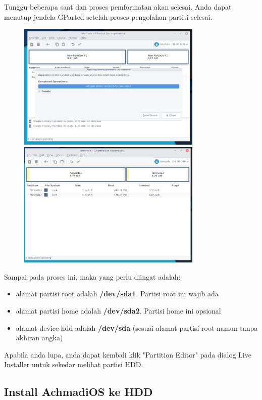 \documentclass[12pt,]{article}
\begin{document}
	Tunggu beberapa saat dan proses pemformatan akan selesai.
	Anda dapat menutup jendela GParted setelah proses pengolahan partisi selesai.
	
	\begin{figure}[h]
		\centering
		\includegraphics[width=250pt]{installhdd/step_14}
		\includegraphics[width=250pt]{installhdd/step_15}
	\end{figure}
	
	Sampai pada proses ini, maka yang perlu diingat adalah:
	\begin{itemize}
		\item alamat partisi root adalah \textbf{/dev/sda1}. Partisi root ini wajib ada
		\item alamat partisi home adalah \textbf{/dev/sda2}. Partisi home ini opsional
		\item alamat device hdd adalah \textbf{/dev/sda} (sesuai alamat partisi root namun tanpa akhiran angka)
	\end{itemize}

	Apabila anda lupa, anda dapat kembali klik "Partition Editor" pada dialog Live Installer untuk sekedar melihat partisi HDD.
	
	\newpage
	\subsection{Install AchmadiOS ke HDD}
	
\end{document}
